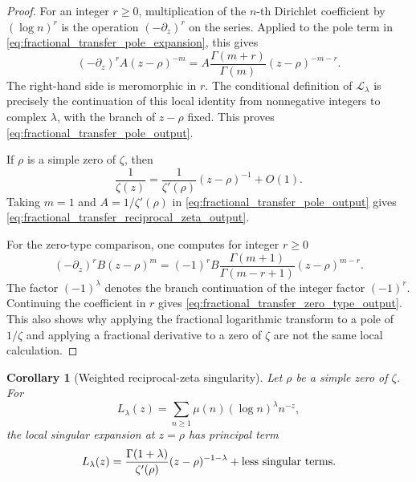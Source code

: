 \documentclass[11pt]{amsart}
\numberwithin{equation}{section}
\theoremstyle{plain}
\newtheorem{corollary}[theorem]{Corollary}
\theoremstyle{definition}
\theoremstyle{remark}
\begin{document}
\begin{proof}
For an integer $r\ge0$, multiplication of the $n$-th Dirichlet
coefficient by $(\log n)^r$ is the operation $(-\partial_z)^r$ on the
series.  Applied to the pole term in
\eqref{eq:fractional_transfer_pole_expansion}, this gives
\begin{equation}
(-\partial_z)^r A(z-\rho)^{-m}
=
A\frac{\Gamma(m+r)}{\Gamma(m)}(z-\rho)^{-m-r}.
\label{eq:fractional_transfer_integer_pole_calculation}
\end{equation}
The right-hand side is meromorphic in $r$.  The conditional definition
of $\mathcal L_\lambda$ is precisely the continuation of this local
identity from nonnegative integers to complex $\lambda$, with the branch
of $z-\rho$ fixed.  This proves
\eqref{eq:fractional_transfer_pole_output}.

If $\rho$ is a simple zero of $\zeta$, then
\begin{equation}
\frac1{\zeta(z)}
=
\frac1{\zeta'(\rho)}(z-\rho)^{-1}+O(1).
\label{eq:fractional_transfer_reciprocal_zeta_input}
\end{equation}
Taking $m=1$ and $A=1/\zeta'(\rho)$ in
\eqref{eq:fractional_transfer_pole_output} gives
\eqref{eq:fractional_transfer_reciprocal_zeta_output}.

For the zero-type comparison, one computes for integer $r\ge0$
\begin{equation}
(-\partial_z)^rB(z-\rho)^m
=
(-1)^rB\frac{\Gamma(m+1)}{\Gamma(m-r+1)}(z-\rho)^{m-r}.
\label{eq:fractional_transfer_integer_zero_calculation}
\end{equation}
The factor $(-1)^\lambda$ denotes the branch continuation of the
integer factor $(-1)^r$.  Continuing the coefficient in $r$ gives
\eqref{eq:fractional_transfer_zero_type_output}.  This also
shows why applying the fractional logarithmic transform to a pole of
$1/\zeta$ and applying a fractional derivative to a zero of $\zeta$ are
not the same local calculation.
\end{proof}

\begin{corollary}[Weighted reciprocal-zeta singularity]
\label{cor:weighted_reciprocal_zeta_singularity}
Let $\rho$ be a simple zero of $\zeta$.  For
\begin{equation}
L_\lambda(z)=\sum_{n\ge1}\mu(n)(\log n)^\lambda n^{-z},
\label{eq:Llambda_definition}
\end{equation}
the local singular expansion at $z=\rho$ has principal term
\begin{equation}
L_\lambda(z)=
\frac{\Gamma(1+\lambda)}{\zeta'(\rho)}(z-\rho)^{-1-\lambda}
+\hbox{less singular terms}.
\label{eq:Llambda_local_singularity}
\end{equation}
\end{corollary}
\end{document}
